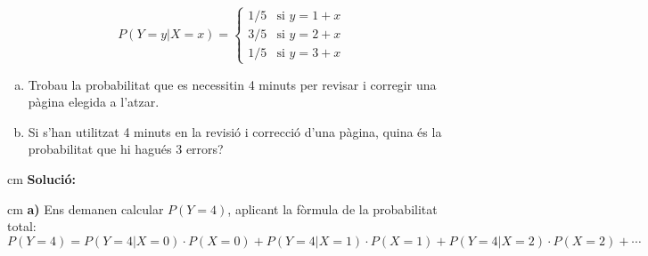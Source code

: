 \documentclass{article}
\begin{document}
\[
P(Y = y | X = x) = \begin{cases}
1/5 & \text{si } y = 1+x\\
3/5 & \text{si } y = 2+x\\
1/5 & \text{si } y = 3+x
\end{cases}
\]
\begin{enumerate}[a)]
\item Trobau la probabilitat que es necessitin 4 minuts per revisar
i corregir una p\`agina elegida a l'atzar. 
\item Si s'han utilitzat 4 minuts en la revisi\'o i correcci\'o d'una
p\`agina, quina \'es la probabilitat que hi hagu\'es 3 errors?
\end{enumerate}

 cm
\noindent
\textbf{Soluci\'o:} 

 cm
\noindent
\textbf{a)} Ens demanen calcular $P(Y=4)$, aplicant la f\`ormula de la probabilitat total:
\[
P(Y=4)=P(Y=4|X=0)\cdot P(X=0) + P(Y=4|X=1)\cdot P(X=1) + P(Y=4|X=2)\cdot P(X=2) + \cdots
\]
\end{document}
